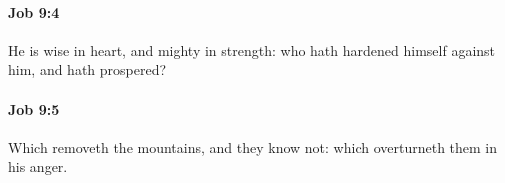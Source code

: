		\paragraph{Job 9:4} %
			\label{JOB-9-4}

			He is wise in heart, and mighty in strength: who hath hardened himself against him, and hath prospered?


		\paragraph{Job 9:5} %
			\label{JOB-9-5}

			Which removeth the mountains, and they know not: which overturneth them in his anger.


